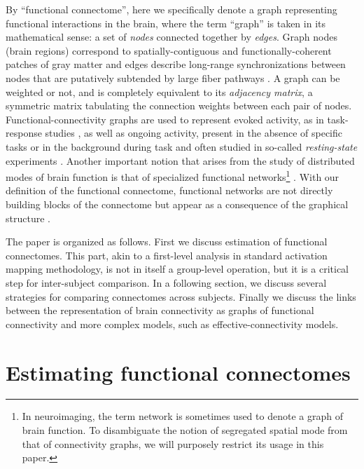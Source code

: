 \documentclass[5p]{elsarticle}
\begin{document}
By ``functional connectome'', here we specifically denote a graph representing
functional interactions in the brain, where the term ``graph'' is taken in its
mathematical sense: a set of \emph{nodes} connected together by \emph{edges}.
Graph nodes (brain regions) correspond to spatially-contiguous and 
functionally-coherent patches of gray matter and edges describe long-range synchronizations between nodes
that are putatively subtended by large fiber pathways \cite{marrelec2006b}.  A
graph can be weighted or not, and is completely equivalent to its
\emph{adjacency matrix}, a symmetric matrix tabulating the connection weights
between each pair of nodes.  Functional-connectivity graphs are used to
represent evoked activity, as in task-response studies \cite{mcintosh2000}, as
well as ongoing activity, present in the absence of specific tasks or in the
background during task and often studied in so-called \emph{resting-state}
experiments \cite{raichle2010}. Another important notion that arises from the
study of distributed modes of brain function is that of specialized functional
networks\footnote{In neuroimaging, the term network is sometimes used to denote
	a graph of brain function. To disambiguate the notion of segregated
	spatial mode \cite{fox2005} from that of connectivity graphs, we will
	purposely restrict its usage in this paper.} \cite{fox2005}. With our
definition of the functional connectome, functional networks are not directly
building blocks of the connectome but appear as a consequence of the graphical
structure \cite{varoquaux2010c,varoquaux2012}.

The paper is organized as follows. First we discuss estimation of functional
connectomes. This part, akin to a first-level analysis in standard activation
mapping methodology, is not in itself a group-level operation, but it is a
critical step for inter-subject comparison.  In a following section, we discuss
several strategies for comparing connectomes across subjects. Finally we discuss
the links between the representation of brain connectivity as graphs of
functional connectivity and more complex models, such as effective-connectivity
models.



\section{Estimating functional connectomes}
\end{document}
